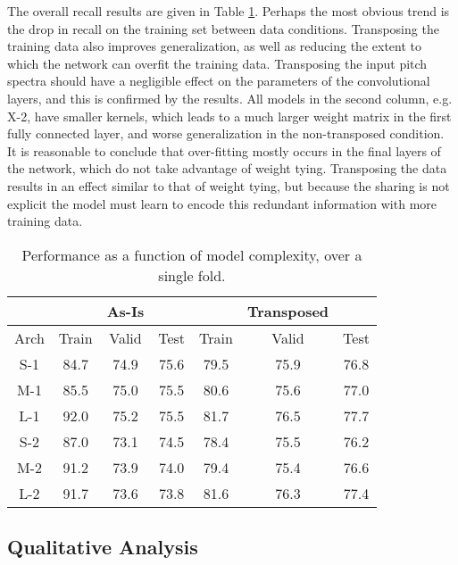 The overall recall results are given in Table \ref{tab:exp2res}.
Perhaps the most obvious trend is the drop in recall on the training set between data conditions.
Transposing the training data also improves generalization, as well as reducing the extent to which the network can overfit the training data.
Transposing the input pitch spectra should have a negligible effect on the parameters of the convolutional layers, and this is confirmed by the results.
All models in the second column, e.g. X-2, have smaller kernels, which leads to a much larger weight matrix in the first fully connected layer, and worse generalization in the non-transposed condition.
It is reasonable to conclude that over-fitting mostly occurs in the final layers of the network, which do not take advantage of weight tying.
Transposing the data results in an effect similar to that of weight tying, but because the sharing is not explicit the model must learn to encode this redundant information with more training data.


\begin{table}[!t]
\caption{Performance as a function of model complexity, over a single fold.}
\label{tab:exp2res}
\centering
\begin{tabular}{ c || c c c || c c c |}
& & As-Is & & & Transposed & \\
 \hline
Arch & Train & Valid & Test & Train & Valid & Test \\
\hline
S-1 & 84.7 & 74.9 & 75.6 & 79.5 & 75.9 & 76.8 \\
M-1 & 85.5 & 75.0 & 75.5 & 80.6 & 75.6 & 77.0 \\
L-1 & 92.0 & 75.2 & 75.5 & 81.7 & 76.5 & 77.7 \\
\hline
S-2 & 87.0 & 73.1 & 74.5 & 78.4 & 75.5 & 76.2 \\
M-2 & 91.2 & 73.9 & 74.0 & 79.4 & 75.4 & 76.6 \\
L-2 & 91.7 & 73.6 & 73.8 & 81.6 & 76.3 & 77.4 \\
\hline
\end{tabular}
\end{table}


\subsection{Qualitative Analysis}
\label{subsec:Qualitative_analysis}

